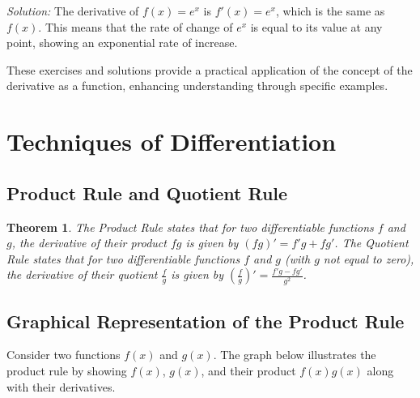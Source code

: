 \documentclass[a4paper,12pt]{book}
\newenvironment{solution}[1][]
{\par\noindent\textit{Solution:} \rmfamily}{\medskip}
\newcounter{example}
\newtheorem{theorem}{Theorem}
\begin{document}
\begin{solution}[to Exercise 4]
The derivative of \( f(x) = e^x \) is \( f'(x) = e^x \), which is the same as \( f(x) \). This means that the rate of change of \( e^x \) is equal to its value at any point, showing an exponential rate of increase.
\end{solution}

These exercises and solutions provide a practical application of the concept of the derivative as a function, enhancing understanding through specific examples.

\section{Techniques of Differentiation}
\subsection{Product Rule and Quotient Rule}
\begin{theorem}
The Product Rule states that for two differentiable functions \( f \) and \( g \), the derivative of their product \( fg \) is given by \( (fg)' = f'g + fg' \). The Quotient Rule states that for two differentiable functions \( f \) and \( g \) (with \( g \) not equal to zero), the derivative of their quotient \( \frac{f}{g} \) is given by \( \left(\frac{f}{g}\right)' = \frac{f'g - fg'}{g^2} \).
\end{theorem}

\subsection{Graphical Representation of the Product Rule}
Consider two functions \( f(x) \) and \( g(x) \). The graph below illustrates the product rule by showing \( f(x) \), \( g(x) \), and their product \( f(x)g(x) \) along with their derivatives.


\begin{center}
\end{center}
\end{document}
